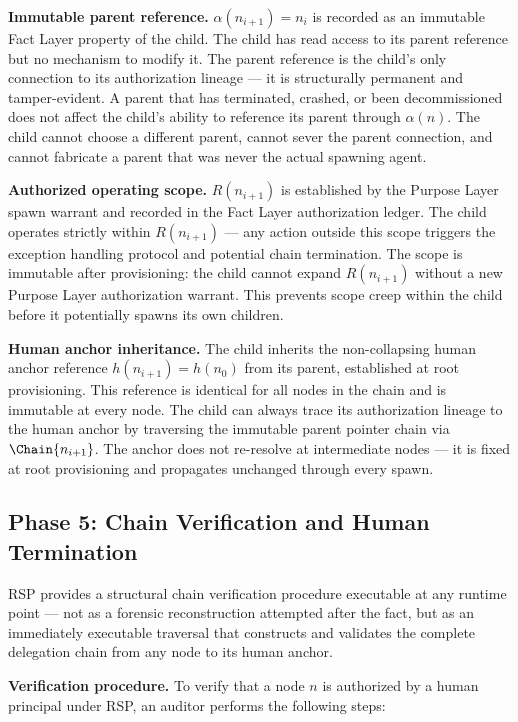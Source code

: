 \medskip
\noindent\textbf{Immutable parent reference.} $\alpha(n_{i+1}) = n_i$ is recorded as an immutable Fact Layer property of the child. The child has read access to its parent reference but no mechanism to modify it. The parent reference is the child's only connection to its authorization lineage — it is structurally permanent and tamper-evident. A parent that has terminated, crashed, or been decommissioned does not affect the child's ability to reference its parent through $\alpha(n)$. The child cannot choose a different parent, cannot sever the parent connection, and cannot fabricate a parent that was never the actual spawning agent.

\medskip
\noindent\textbf{Authorized operating scope.} $R(n_{i+1})$ is established by the Purpose Layer spawn warrant and recorded in the Fact Layer authorization ledger. The child operates strictly within $R(n_{i+1})$ — any action outside this scope triggers the exception handling protocol and potential chain termination. The scope is immutable after provisioning: the child cannot expand $R(n_{i+1})$ without a new Purpose Layer authorization warrant. This prevents scope creep within the child before it potentially spawns its own children.

\medskip
\noindent\textbf{Human anchor inheritance.} The child inherits the non-collapsing human anchor reference $h(n_{i+1}) = h(n_0)$ from its parent, established at root provisioning. This reference is identical for all nodes in the chain and is immutable at every node. The child can always trace its authorization lineage to the human anchor by traversing the immutable parent pointer chain via $\Chain{n_{i+1}}$. The anchor does not re-resolve at intermediate nodes — it is fixed at root provisioning and propagates unchanged through every spawn.

\subsection{Phase 5: Chain Verification and Human Termination}

RSP provides a structural chain verification procedure executable at any runtime point — not as a forensic reconstruction attempted after the fact, but as an immediately executable traversal that constructs and validates the complete delegation chain from any node to its human anchor.

\medskip
\noindent\textbf{Verification procedure.} To verify that a node $n$ is authorized by a human principal under RSP, an auditor performs the following steps:

